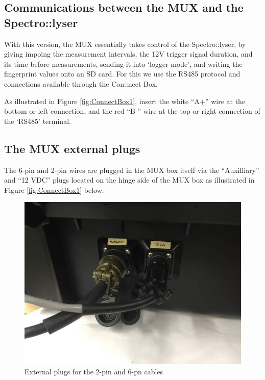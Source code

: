 \documentclass[]{book}
\begin{document}
\hypertarget{communications-between-the-mux-and-the-spectrolyser}{%
\subsection{Communications between the MUX and the Spectro::lyser}\label{communications-between-the-mux-and-the-spectrolyser}}

With this version, the MUX essentially takes control of the Spectro::lyser, by giving impoing the measurement intervals, the 12V trigger signal duration, and its time before measurements, sending it into `logger mode', and writing the fingerprint values onto an SD card. For this we use the RS485 protocol and connections available through the Con::nect Box.

As illustrated in Figure \ref{fig:ConnectBox1}, insert the white ``A+'' wire at the bottom or left connection, and the red ``B-'' wire at the top or right connection of the `RS485' terminal.

\hypertarget{the-mux-external-plugs}{%
\subsection{The MUX external plugs}\label{the-mux-external-plugs}}

The 6-pin and 2-pin wires are plugged in the MUX box itself via the ``Auxilliary'' and ``12 VDC'' plugs located on the hinge side of the MUX box as illustrated in Figure \ref{fig:ConnectBox1} below.

\begin{figure}

{\centering \includegraphics[width=0.8\linewidth]{pictures/ExternalPlugs} 

}

\caption{External plugs for the 2-pin and 6-pn cables}\label{fig:ExternalPlugs}
\end{figure}
\end{document}
